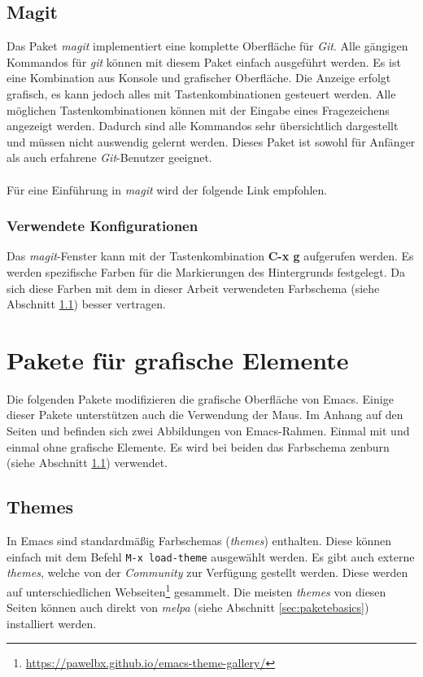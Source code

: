 \subsection{Magit}
\label{subsec:magit}
Das Paket \textit{magit} implementiert eine komplette Oberfläche für
\textit{Git}. Alle gängigen Kommandos für \textit{git} können mit
diesem Paket einfach ausgeführt werden. Es ist eine Kombination aus
Konsole und grafischer Oberfläche. Die Anzeige erfolgt grafisch, es
kann jedoch alles mit Tastenkombinationen gesteuert werden. Alle
möglichen Tastenkombinationen können mit der Eingabe eines
Fragezeichens angezeigt werden. Dadurch sind alle Kommandos sehr
übersichtlich dargestellt und müssen nicht auswendig gelernt
werden. Dieses Paket ist sowohl für Anfänger als auch erfahrene
\textit{Git}-Benutzer geeignet. \cite{Magit}\\\\ Für eine Einführung
in \textit{magit} wird der folgende Link \cite{MagitGuide}
empfohlen.\\

\subsubsection{Verwendete Konfigurationen}
Das \textit{magit}-Fenster kann mit der Tastenkombination \textbf{C-x
  g} aufgerufen werden. Es werden spezifische Farben für die
Markierungen des Hintergrunds festgelegt. Da sich diese Farben mit dem
in dieser Arbeit verwendeten Farbschema (siehe Abschnitt
\ref{subsec:themes}) besser vertragen.\\

\section{Pakete für grafische Elemente}
\label{sec:gui}
Die folgenden Pakete modifizieren die grafische Oberfläche von
Emacs. Einige dieser Pakete unterstützen auch die Verwendung der
Maus. Im Anhang auf den Seiten \pageref{fig:nogui} und
\pageref{fig:gui} befinden sich zwei Abbildungen von
Emacs-Rahmen. Einmal mit und einmal ohne grafische Elemente. Es wird
bei beiden das Farbschema {\glqq}zenburn{\grqq} (siehe Abschnitt
\ref{subsec:themes}) verwendet.\\

\subsection{Themes}
\label{subsec:themes}
In Emacs sind standardmäßig {\glqq}Farbschemas{\grqq}
(\textit{themes}) enthalten. Diese können einfach mit dem Befehl
\texttt{M-x load-theme} ausgewählt werden. Es gibt auch externe
\textit{themes}, welche von der \textit{Community} zur Verfügung
gestellt werden. Diese werden auf unterschiedlichen
Webseiten\footnote{\url{https://pawelbx.github.io/emacs-theme-gallery/}}
gesammelt. Die meisten \textit{themes} von diesen Seiten können auch
direkt von \textit{melpa} (siehe Abschnitt \ref{sec:paketebasics})
installiert werden.\\

